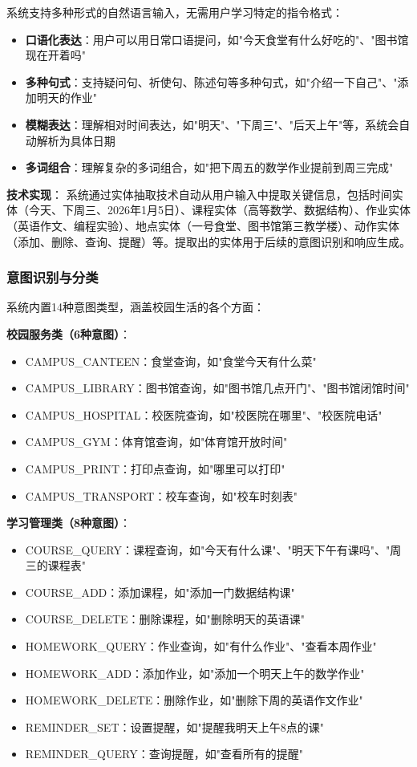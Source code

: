\documentclass[12pt,a4paper]{article}
\begin{document}
系统支持多种形式的自然语言输入，无需用户学习特定的指令格式：

\begin{itemize}
    \item \textbf{口语化表达}：用户可以用日常口语提问，如"今天食堂有什么好吃的"、"图书馆现在开着吗"
    \item \textbf{多种句式}：支持疑问句、祈使句、陈述句等多种句式，如"介绍一下自己"、"添加明天的作业"
    \item \textbf{模糊表达}：理解相对时间表达，如"明天"、"下周三"、"后天上午"等，系统会自动解析为具体日期
    \item \textbf{多词组合}：理解复杂的多词组合，如"把下周五的数学作业提前到周三完成"
\end{itemize}

\textbf{技术实现}：
系统通过实体抽取技术自动从用户输入中提取关键信息，包括时间实体（今天、下周三、2026年1月5日）、课程实体（高等数学、数据结构）、作业实体（英语作文、编程实验）、地点实体（一号食堂、图书馆第三教学楼）、动作实体（添加、删除、查询、提醒）等。提取出的实体用于后续的意图识别和响应生成。

\subsubsection{意图识别与分类}

系统内置14种意图类型，涵盖校园生活的各个方面：

\textbf{校园服务类（6种意图）}：
\begin{itemize}
    \item CAMPUS\_CANTEEN：食堂查询，如"食堂今天有什么菜"
    \item CAMPUS\_LIBRARY：图书馆查询，如"图书馆几点开门"、"图书馆闭馆时间"
    \item CAMPUS\_HOSPITAL：校医院查询，如"校医院在哪里"、"校医院电话"
    \item CAMPUS\_GYM：体育馆查询，如"体育馆开放时间"
    \item CAMPUS\_PRINT：打印点查询，如"哪里可以打印"
    \item CAMPUS\_TRANSPORT：校车查询，如"校车时刻表"
\end{itemize}

\textbf{学习管理类（8种意图）}：
\begin{itemize}
    \item COURSE\_QUERY：课程查询，如"今天有什么课"、"明天下午有课吗"、"周三的课程表"
    \item COURSE\_ADD：添加课程，如"添加一门数据结构课"
    \item COURSE\_DELETE：删除课程，如"删除明天的英语课"
    \item HOMEWORK\_QUERY：作业查询，如"有什么作业"、"查看本周作业"
    \item HOMEWORK\_ADD：添加作业，如"添加一个明天上午的数学作业"
    \item HOMEWORK\_DELETE：删除作业，如"删除下周的英语作文作业"
    \item REMINDER\_SET：设置提醒，如"提醒我明天上午8点的课"
    \item REMINDER\_QUERY：查询提醒，如"查看所有的提醒"
\end{itemize}
\end{document}
